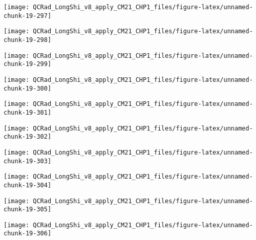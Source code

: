 \documentclass[
  10pt,
  a4paper,oneside]{article}
\begin{document}
\begin{center}\texttt{[image: QCRad\_LongShi\_v8\_apply\_CM21\_CHP1\_files/figure-latex/unnamed-chunk-19-297]} \end{center}

\begin{center}\texttt{[image: QCRad\_LongShi\_v8\_apply\_CM21\_CHP1\_files/figure-latex/unnamed-chunk-19-298]} \end{center}

\begin{center}\texttt{[image: QCRad\_LongShi\_v8\_apply\_CM21\_CHP1\_files/figure-latex/unnamed-chunk-19-299]} \end{center}

\begin{center}\texttt{[image: QCRad\_LongShi\_v8\_apply\_CM21\_CHP1\_files/figure-latex/unnamed-chunk-19-300]} \end{center}

\begin{center}\texttt{[image: QCRad\_LongShi\_v8\_apply\_CM21\_CHP1\_files/figure-latex/unnamed-chunk-19-301]} \end{center}

\begin{center}\texttt{[image: QCRad\_LongShi\_v8\_apply\_CM21\_CHP1\_files/figure-latex/unnamed-chunk-19-302]} \end{center}

\begin{center}\texttt{[image: QCRad\_LongShi\_v8\_apply\_CM21\_CHP1\_files/figure-latex/unnamed-chunk-19-303]} \end{center}

\begin{center}\texttt{[image: QCRad\_LongShi\_v8\_apply\_CM21\_CHP1\_files/figure-latex/unnamed-chunk-19-304]} \end{center}

\begin{center}\texttt{[image: QCRad\_LongShi\_v8\_apply\_CM21\_CHP1\_files/figure-latex/unnamed-chunk-19-305]} \end{center}

\begin{center}\texttt{[image: QCRad\_LongShi\_v8\_apply\_CM21\_CHP1\_files/figure-latex/unnamed-chunk-19-306]} \end{center}
\end{document}
